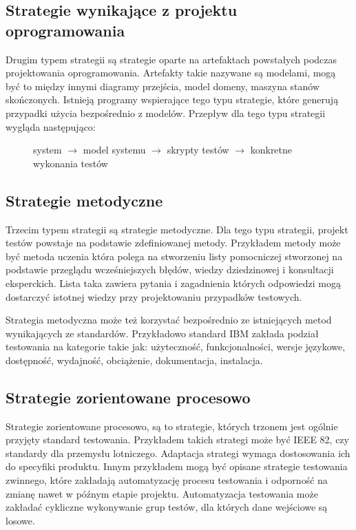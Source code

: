 \subsection{Strategie wynikające z projektu oprogramowania}
Drugim typem strategii są strategie oparte na artefaktach powstałych podczas projektowania oprogramowania. Artefakty takie nazywane są modelami, mogą być to między innymi diagramy przejścia, model domeny, maszyna stanów skończonych. Istnieją programy wspierające tego typu strategie, które generują przypadki użycia bezpośrednio z modelów. Przepływ dla tego typu strategii wygląda następująco: 
\begin{figure}[h!]
  \begin{center}
   system $\rightarrow$  model systemu $\rightarrow$ skrypty testów  $\rightarrow$  konkretne wykonania testów 
  \end{center}
\end{figure}
     
  
\subsection{Strategie metodyczne}
Trzecim typem strategii są strategie metodyczne. Dla tego typu strategii, projekt testów powstaje na podstawie zdefiniowanej metody. Przykładem metody może być metoda uczenia która polega na stworzeniu listy pomocniczej stworzonej na podstawie przeglądu wcześniejszych błędów, wiedzy dziedzinowej i konsultacji eksperckich. Lista taka zawiera pytania i zagadnienia których odpowiedzi mogą dostarczyć istotnej wiedzy przy projektowaniu przypadków testowych.

Strategia metodyczna może też korzystać bezpośrednio ze istniejących metod wynikających ze standardów. Przykładowo standard IBM zakłada podział testowania na kategorie takie jak: użyteczność, funkcjonalności, wersje językowe, dostępność, wydajność, obciążenie, dokumentacja, instalacja.
\subsection{Strategie zorientowane procesowo}
Strategie zorientowane procesowo, są to strategie, których trzonem jest ogólnie przyjęty standard testowania. Przykładem takich strategi może być IEEE 82, czy standardy dla przemysłu lotniczego. Adaptacja strategi wymaga dostosowania ich do specyfiki produktu. Innym przykładem mogą być opisane strategie testowania zwinnego, które zakładają automatyzację procesu testowania i odporność na zmianę nawet w późnym etapie projektu. Automatyzacja testowania może zakładać cykliczne wykonywanie grup testów, dla których dane wejściowe są losowe.
